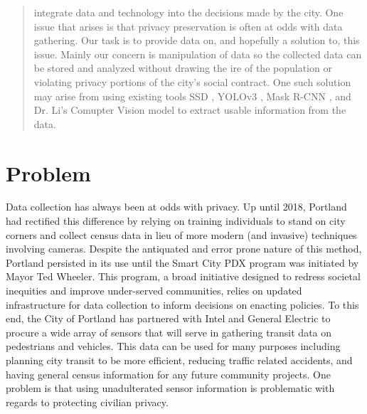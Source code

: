\documentclass[onecolumn, draftclsnofoot,10pt, compsoc]{IEEEtran}
\begin{document}
\begin{titlepage}
\begin{singlespace}
\begin{abstract}
        integrate data and technology into the decisions made by the city. One 
        issue that arises is that privacy preservation is often at odds with data gathering. Our task is to provide data 
        on, and hopefully a solution to, this issue. Mainly our concern is 
        manipulation of data so the collected data can be stored and analyzed without
        drawing the ire of the population or violating privacy portions of the 
        city's social contract. One such solution may arise from using existing 
        tools SSD \cite{SSD}, YOLOv3 \cite{YOLOv3}, Mask R-CNN \cite{mask-r-cnn}, and Dr. Li's Comupter Vision model \cite{li-model} to extract usable information from the data.
        \end{abstract}     
    \end{singlespace}
\end{titlepage}
\newpage
{}
\tableofcontents
\clearpage

\section{Problem}
Data collection has always been at odds with privacy. Up until 2018, Portland had rectified this difference by relying on training individuals to stand on city corners and collect census data in lieu of more modern (and invasive) techniques involving cameras. Despite the antiquated and error prone nature of this method, Portland persisted in its use until the Smart City PDX program was initiated by Mayor Ted Wheeler. This program, a broad initiative designed to redress societal inequities and improve under-served communities, relies on updated infrastructure for data collection to inform decisions on enacting policies. To this end, the City of Portland has partnered with Intel and General Electric to procure a wide array of sensors that will serve in gathering transit data on pedestrians and vehicles. This data can be used for many purposes including planning city transit to be more efficient, reducing traffic related accidents, and having general census information for any future community projects. One problem is that using unadulterated sensor information is problematic with regards to protecting civilian privacy.
\end{document}
